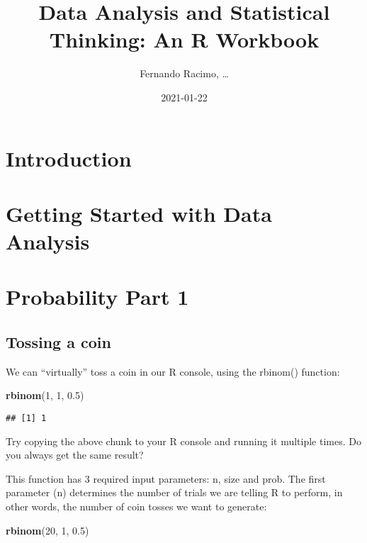 \documentclass[
]{book}
\title{Data Analysis and Statistical Thinking: An R Workbook}
\author{Fernando Racimo, \ldots{}}
\date{2021-01-22}
\newenvironment{Shaded}{\begin{snugshade}}{\end{snugshade}}
\newcommand{\DecValTok}[1]{\textcolor[rgb]{0.00,0.00,0.81}{#1}}
\newcommand{\FloatTok}[1]{\textcolor[rgb]{0.00,0.00,0.81}{#1}}
\newcommand{\KeywordTok}[1]{\textcolor[rgb]{0.13,0.29,0.53}{\textbf{#1}}}
\newcommand{\NormalTok}[1]{#1}
\begin{document}
\maketitle

{
\setcounter{tocdepth}{1}
\tableofcontents
}
\hypertarget{introduction}{%
\chapter{Introduction}\label{introduction}}

\hypertarget{intro}{%
\chapter{Getting Started with Data Analysis}\label{intro}}

\hypertarget{prob1}{%
\chapter{Probability Part 1}\label{prob1}}

\hypertarget{tossing-a-coin}{%
\section{Tossing a coin}\label{tossing-a-coin}}

We can ``virtually'' toss a coin in our R console, using the rbinom() function:

\begin{Shaded}
\begin{Highlighting}[]
\KeywordTok{rbinom}\NormalTok{(}\DecValTok{1}\NormalTok{, }\DecValTok{1}\NormalTok{, }\FloatTok{0.5}\NormalTok{)}
\end{Highlighting}
\end{Shaded}

\begin{verbatim}
## [1] 1
\end{verbatim}

Try copying the above chunk to your R console and running it multiple times. Do you always get the same result?

This function has 3 required input parameters: n, size and prob. The first parameter (n) determines the number of trials we are telling R to perform, in other words, the number of coin tosses we want to generate:

\begin{Shaded}
\begin{Highlighting}[]
\KeywordTok{rbinom}\NormalTok{(}\DecValTok{20}\NormalTok{, }\DecValTok{1}\NormalTok{, }\FloatTok{0.5}\NormalTok{)}
\end{Highlighting}
\end{Shaded}
\end{document}
